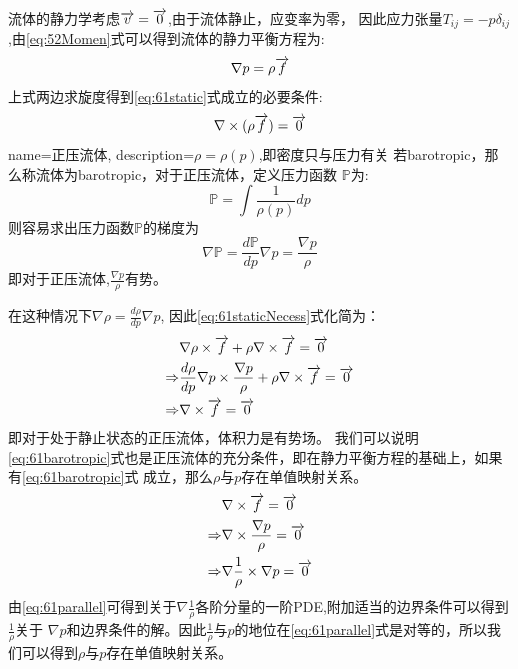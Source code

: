 流体的静力学考虑$\overrightarrow{v}=\overrightarrow{0}$,由于流体静止，应变率为零，
因此应力张量$T_{ij}=-p\delta_{ij}$,由\eqref{eq:52Momen}式可以得到流体的静力平衡方程为:
\begin{equation}\label{eq:61static}
\nabla p = \rho \overrightarrow{f}
\end{equation}
上式两边求旋度得到\eqref{eq:61static}式成立的必要条件:
\begin{equation}\label{eq:61staticNecess}
\nabla \times (\rho \overrightarrow{f})=\overrightarrow{0}
\end{equation}
{
  name=正压流体,
  description={$\rho=\rho(p)$,即密度只与压力有关}
}
若\glsdesc{barotropic}，那么称流体为\gls{barotropic}，对于正压流体，定义压力函数
$\mathbb{P}$为:
\begin{equation}
\mathbb{P}=\int \frac{1}{\rho(p)}dp
\end{equation}
则容易求出压力函数$\mathbb{P}$的梯度为
\begin{equation}\label{eq:61barotropicPotential}
\nabla \mathbb{P} =\frac{d \mathbb{P}}{dp} \nabla p = \frac{\nabla p}{\rho}
\end{equation}
即对于正压流体,$\frac{\nabla p}{\rho}$有势。

在这种情况下$\nabla \rho=\frac{d\rho}{dp}\nabla p$,
因此\eqref{eq:61staticNecess}式化简为：
\begin{align}
&\nabla \rho \times \overrightarrow{f} + \rho \nabla \times \overrightarrow{f} =  \overrightarrow{0}\label{eq:61staticExpand}\\
\Rightarrow & \frac{d\rho}{dp}\nabla p \times \frac{\nabla p}{\rho} + \rho \nabla \times \overrightarrow{f} =  \overrightarrow{0}\nonumber\\
\Rightarrow  &  \nabla \times \overrightarrow{f} =  \overrightarrow{0}\label{eq:61barotropic}
\end{align}
即对于处于静止状态的正压流体，体积力是有势场。
我们可以说明\eqref{eq:61barotropic}式也是正压流体的充分条件，即在静力平衡方程的基础上，如果有\eqref{eq:61barotropic}式
成立，那么$\rho$与$p$存在单值映射关系。
\begin{align}
&\nabla \times \overrightarrow{f} =  \overrightarrow{0}\nonumber\\
\Rightarrow & \nabla \times \frac{\nabla p}{\rho} =  \overrightarrow{0}\nonumber\\
\Rightarrow  &   \nabla \frac{1}{\rho} \times \nabla p =  \overrightarrow{0}\label{eq:61parallel}
\end{align}
由\eqref{eq:61parallel}可得到关于$\nabla \frac{1}{\rho}$各阶分量的一阶PDE,附加适当的边界条件可以得到$\frac{1}{\rho}$关于
$\nabla p$和边界条件的解。因此$\frac{1}{\rho}$与$p$的地位在\eqref{eq:61parallel}式是对等的，所以我们可以得到$\rho$与$p$存在单值映射关系。

